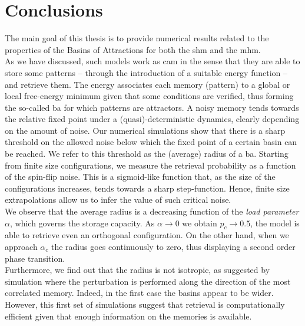 \documentclass[\rootdir/main.tex]{subfiles}
\begin{document}
\chapter{Conclusions}\label{chap:conclusions}
The main goal of this thesis is to provide numerical results related to the properties of the Basins of Attractions for both the \acrlong{shm} and the \acrlong{mhm}.\\
As we have discussed, such models work as \acrlong{cam} in the sense that they are able to store some patterns -- through the introduction of a suitable energy function -- and retrieve them. The energy associates each memory (pattern) to a global or local free-energy minimum given that some conditions are verified, thus forming the so-called \acrlong{ba} for which patterns are attractors. A noisy memory tends towards the relative fixed point under a (quasi)-deterministic dynamics, clearly depending on the amount of noise. Our numerical simulations show that there is a sharp threshold on the allowed noise below which the fixed point of a certain basin can be reached. We refer to this threshold as the (average) radius of a \acrshort{ba}. Starting from finite size configurations, we measure the retrieval probability as a function of the spin-flip noise. This is a sigmoid-like function that, as the size of the configurations increases, tends towards a sharp step-function. Hence, finite size extrapolations allow us to infer the value of such critical noise.\\
We observe that the average radius is a decreasing function of the \emph{load parameter} $\alpha$, which governs the storage capacity. As $\alpha \to 0$ we obtain $p_c \to 0.5$, \ie the model is able to retrieve even an orthogonal configuration. On the other hand, when we approach $\alpha_c$ the radius goes continuously to zero, thus displaying a second order phase transition.\\
Furthermore, we find out that the radius is not isotropic, as suggested by simulation where the perturbation is performed along the direction of the most correlated memory. Indeed, in the first case the basins appear to be wider.
However, this first set of simulations suggest that retrieval is computationally efficient given that enough information on the memories is available.
\end{document}
